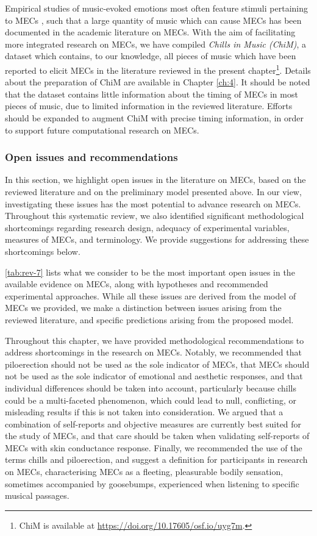 Empirical studies of music-evoked emotions most often feature stimuli pertaining to MECs \parencite{warrenburg2020}, such that a large quantity of music which can cause MECs has been documented in the academic literature on MECs. With the aim of facilitating more integrated research on MECs, we have compiled \emph{Chills in Music (ChiM)}, a dataset which contains, to our knowledge, all pieces of music which have been reported to elicit MECs in the literature reviewed in the present chapter\footnote{ChiM is available at \url{https://doi.org/10.17605/osf.io/uyg7m}.}. Details about the preparation of ChiM are available in Chapter \ref{ch:4}. It should be noted that the dataset contains little information about the timing of MECs in most pieces of music, due to limited information in the reviewed literature. Efforts should be expanded to augment ChiM with precise timing information, in order to support future computational research on MECs.

\subsubsection{Open issues and recommendations}

In this section, we highlight open issues in the literature on MECs, based on the reviewed literature and on the preliminary model presented above. In our view, investigating these issues has the most potential to advance research on MECs. Throughout this systematic review, we also identified significant methodological shortcomings regarding research design, adequacy of experimental variables, measures of MECs, and terminology. We provide suggestions for addressing these shortcomings below.

\autoref{tab:rev-7} lists what we consider to be the most important open issues in the available evidence on MECs, along with hypotheses and recommended experimental approaches. While all these issues are derived from the model of MECs we provided, we make a distinction between issues arising from the reviewed literature, and specific predictions arising from the proposed model.



Throughout this chapter, we have provided methodological recommendations to address shortcomings in the research on MECs. Notably, we recommended that piloerection should not be used as the sole indicator of MECs, that MECs should not be used as the sole indicator of emotional and aesthetic responses, and that individual differences should be taken into account, particularly because chills could be a multi-faceted phenomenon, which could lead to null, conflicting, or misleading results if this is not taken into consideration. We argued that a combination of self-reports and objective measures are currently best suited for the study of MECs, and that care should be taken when validating self-reports of MECs with skin conductance response. Finally, we recommended the use of the terms chills and piloerection, and suggest a definition for participants in research on MECs, characterising MECs as a fleeting, pleasurable bodily sensation, sometimes accompanied by goosebumps, experienced when listening to specific musical passages.

